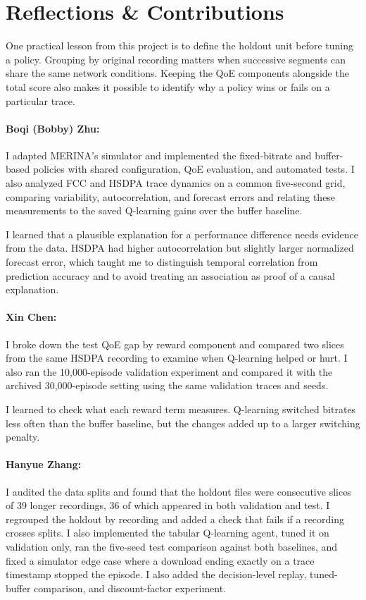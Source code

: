 \documentclass[10pt,letterpaper]{article}
\begin{document}
\section{Reflections \& Contributions}

One practical lesson from this project is to define the holdout unit before
tuning a policy. Grouping by original recording matters when successive
segments can share the same network conditions. Keeping the QoE components
alongside the total score also makes it possible to identify why a policy
wins or fails on a particular trace.

\paragraph{Boqi (Bobby) Zhu:}
I adapted MERINA's simulator and implemented the fixed-bitrate and buffer-based
policies with shared configuration, QoE evaluation, and automated tests.
I also analyzed FCC and HSDPA trace dynamics on a common five-second grid,
comparing variability, autocorrelation, and forecast errors and relating
these measurements to the saved Q-learning gains over the buffer baseline.

I learned that a plausible explanation for a performance difference needs
evidence from the data. HSDPA had higher autocorrelation but slightly larger
normalized forecast error, which taught me to distinguish temporal correlation
from prediction accuracy and to avoid treating an association as proof of a
causal explanation.

\paragraph{Xin Chen:}
I broke down the test QoE gap by reward component and compared two slices
from the same HSDPA recording to examine when Q-learning helped or hurt.
I also ran the 10,000-episode validation experiment and compared it with the
archived 30,000-episode setting using the same validation traces and seeds.

I learned to check what each reward term measures. Q-learning switched
bitrates less often than the buffer baseline, but the changes added up to a
larger switching penalty.

\paragraph{Hanyue Zhang:}
I audited the data splits and found that the holdout files were consecutive
slices of 39 longer recordings, 36 of which appeared in both validation and
test. I regrouped the holdout by recording and added a check that fails if a
recording crosses splits. I also implemented the tabular Q-learning agent,
tuned it on validation only, ran the five-seed test comparison against both
baselines, and fixed a simulator edge case where a download ending exactly on
a trace timestamp stopped the episode.
I also added the decision-level replay, tuned-buffer comparison, and
discount-factor experiment.
\end{document}
